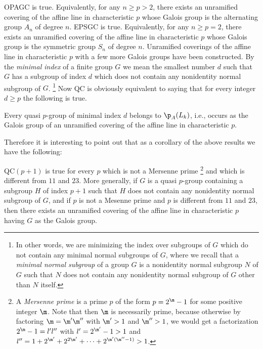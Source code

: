  OPAGC is true. Equivalently, 
for any $n\geq p >2$,
there exists an unramified covering of the affine line in 
characteristic
$p$ whose Galois group is the alternating group $A_n$ of 
degree $n$.
\endproclaim
{} EPSGC is true. Equivalently, 
for any $n\geq p =2$,
there exists an unramified covering of the affine line in 
characteristic
$p$ whose Galois group is the symmetric group $S_n$ of 
degree $n$.
\endproclaim
{} Unramified coverings of the 
affine line in 
characteristic $p$ with a few more Galois groups have been 
constructed.
\endproclaim 
{} By the {\it minimal index\/} 
of a finite group $G$ we mean the 
smallest number $d$ such that $G$ has a subgroup of index 
$d$ which does not
contain any nonidentity normal subgroup of $G$. 
\footnote{In other words, we are minimizing the index over 
subgroups of $G$ 
which do not contain any minimal normal subgroups of 
$G$\<, where we recall 
that a {\it minimal normal subgroup\/} of a group $G$ is a 
nonidentity 
normal subgroup $N$ of $G$ such that $N$ does not contain 
any nonidentity
normal subgroup of $G$ other than $N$ itself.} 
Now QC is obviously equivalent to saying that for every 
integer 
$d\geq p$ the following is true.
\enddfn

 Every quasi $p$-group of minimal index 
$d$ belongs to
$\p_A(L_k)$, i.e., occurs as the Galois group of an 
unramified covering of
the affine line in characteristic $p$.
\endproclaim
 
Therefore it is interesting to point out that as a 
corollary of the above 
results we have the following:

 QC$(p+1)$ is true for every 
$p$ which is not a
Mersenne prime 
\footnote{A {\it Mersenne prime} is a prime $p$ 
of the form $p=2^{\m}-1$ for 
some positive integer $\m$. Note that then $\m$ is 
necessarily prime,
because otherwise by factoring
$\m=\m'\m''$ with $\m'>1$ and $\m''>1$, we would get a 
factorization
$2^{\m}-1=l'l''$ with $l'=2^{\m'}-1>1$ and 
$l''=1+2^{\m'}+2^{2\m'}+\dots+2^{\m'(\m''-1)}>1$.}
and which is different from $11$ and $23$.
More generally, if $G$ is a quasi $p$-group containing a 
subgroup $H$ of
index $p+1$ such that $H$ does not contain any nonidentity 
normal subgroup
of $G$, and if $p$ is not a Mesenne prime and $p$ is 
different from $11$ and
$23$, then there exists an unramified covering of the 
affine line in
characteristic $p$ having $G$ as the Galois group.
\endproclaim

